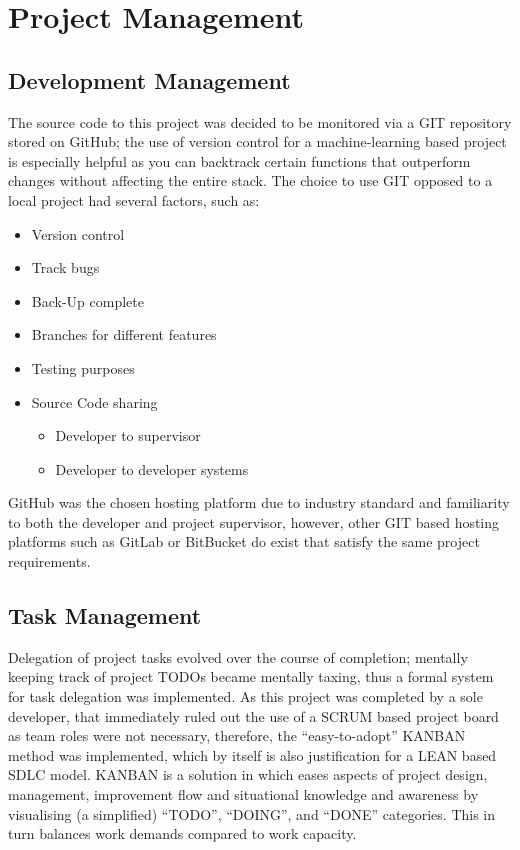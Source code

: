\section{Project Management}

\subsection{Development Management}

The source code to this project was decided to be monitored via a GIT repository stored on GitHub; the use of version control for a machine-learning based project is especially helpful as you can backtrack certain functions that outperform changes without affecting the entire stack. The choice to use GIT opposed to a local project had several factors, such as:

\begin{itemize}
    \item Version control
    \item Track bugs
    \item Back-Up complete
    \item Branches for different features
    \item Testing purposes
    \item Source Code sharing
        \begin{itemize}
            \item Developer to supervisor
            \item Developer to developer systems
        \end{itemize}
\end{itemize}

GitHub was the chosen hosting platform due to industry standard and familiarity to both the developer and project supervisor, however, other GIT based hosting platforms such as GitLab or BitBucket do exist that satisfy the same project requirements.

\newpage

\subsection{Task Management}

Delegation of project tasks evolved over the course of completion; mentally keeping track of project TODOs became mentally taxing, thus a formal system for task delegation was implemented. As this project was completed by a sole developer, that immediately ruled out the use of a SCRUM based project board as team roles were not necessary, therefore, the “easy-to-adopt” KANBAN method was implemented, which by itself is also justification for a LEAN based SDLC model. KANBAN is a solution in which eases aspects of project design, management, improvement flow and situational knowledge and awareness by visualising (a simplified) “TODO”, “DOING”, and “DONE” categories. This in turn balances work demands compared to work capacity.

